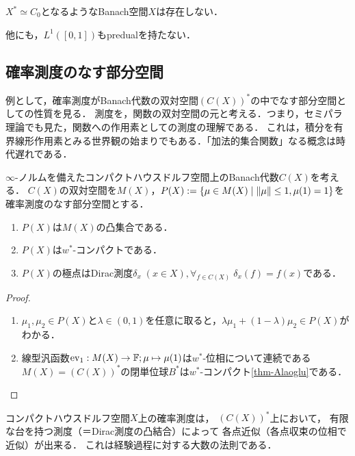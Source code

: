 \documentclass[uplatex,dvipdfmx]{jsreport}
\begin{document}
\begin{corollary}
    $X^*\simeq C_0$となるようなBanach空間$X$は存在しない．
\end{corollary}
\begin{remark}
    他にも，$L^1([0,1])$もpredualを持たない．
\end{remark}

\subsection{確率測度のなす部分空間}

\begin{tcolorbox}[colframe=ForestGreen, colback=ForestGreen!10!white,breakable,colbacktitle=ForestGreen!40!white,coltitle=black,fonttitle=\bfseries\sffamily,
title=]
    例として，確率測度がBanach代数の双対空間$(C(X))^*$の中でなす部分空間としての性質を見る．
    測度を，関数の双対空間の元と考える．つまり，セミパラ理論でも見た，関数への作用素としての測度の理解である．
    これは，積分を有界線形作用素とみる世界観の始まりでもある．「加法的集合関数」なる概念は時代遅れである．
\end{tcolorbox}

\begin{proposition}
    $\infty$-ノルムを備えたコンパクトハウスドルフ空間上のBanach代数$C(X)$を考える．
    $C(X)$の双対空間を$M(X)$，$P(X):=\left\{\mu\in M(X)\mid\|\mu\|\le 1,\mu(1)=1\right\}$を確率測度のなす部分空間とする．
    \begin{enumerate}
        \item $P(X)$は$M(X)$の凸集合である．
        \item $P(X)$は$w^*$-コンパクトである．
        \item $P(X)$の極点はDirac測度$\delta_x\;(x\in X),\forall_{f\in C(X)}\;\delta_x(f)=f(x)$である．
    \end{enumerate}
\end{proposition}
\begin{proof}\mbox{}
    \begin{enumerate}
        \item $\mu_1,\mu_2\in P(X)$と$\lambda\in(0,1)$を任意に取ると，$\lambda\mu_1+(1-\lambda)\mu_2\in P(X)$がわかる．
        \item 線型汎函数$\mathrm{ev}_1:M(X)\to\mathbb{F};\mu\mapsto\mu(1)$は$w^*$-位相について連続である
        $M(X)=(C(X))^*$の閉単位球$B^*$は$w^*$-コンパクト\ref{thm-Alaoglu}である．
    \end{enumerate}
\end{proof}
\begin{remarks}
    コンパクトハウスドルフ空間$X$上の確率測度は，
    $(C(X))^*$上において，
    有限な台を持つ測度（＝Dirac測度の凸結合）によって
    各点近似（各点収束の位相で近似）が出来る．
    これは経験過程に対する大数の法則である．
\end{remarks}
\end{document}
